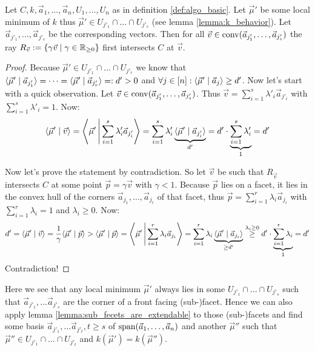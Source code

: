 \begin{lemma}
    \label{lemma:local_minimum_faces_is_visible_from_origin}
    Let $C, k, \vec a_1, \dots, \vec a_n, U_1, \dots, U_n$ as in definition \ref{def:algo_basic}. Let $\vec\mu'$ be some local minimum of $k$ thus $\vec\mu' \in U_{j'_1}\cap \dots \cap U_{j'_s}$ (see lemma \ref{lemma:k_behavior}). Let $\vec a_{j'_1}, \dots, \vec a_{j'_s}$ be the corresponding vectors. Then for all $\vec v \in \operatorname{conv}(\vec a_{j'_1}, \dots, \vec a_{j'_s})$ the ray $R_{\vec v} := \{\gamma\vec v \mid \gamma \in \mathbb{R}_{\geq 0}\}$ first intersects $C$ at $\vec v$.
\end{lemma}
\begin{proof}
    Because $\vec \mu' \in U_{j'_1}\cap \dots \cap U_{j'_r}$ we know that $\langle \vec\mu' \mid \vec a_{j'_1} \rangle = \dots = \langle \vec\mu' \mid \vec a_{j'_r} \rangle =: d' > 0$ and $\forall j\in [n]: \langle \vec\mu' \mid \vec a_j \rangle \geq d'$. Now let's start with a quick observation. Let $\vec v \in \operatorname{conv}(\vec a_{j'_1}, \dots, \vec a_{j'_s})$. Thus $\vec v = \sum_{i=1}^{s}\lambda'_i\vec a_{j'_i}$ with $\sum_{i=1}^{s}\lambda'_i = 1$. Now:
    $$\langle \vec\mu' \mid \vec v \rangle = \left\langle \vec\mu' \,\middle|\, \sum_{i=1}^{s}\lambda'_i\vec a_{j'_i} \right\rangle = \sum_{i=1}^{s}\lambda'_i \underbrace{\langle \vec\mu' \mid \vec a_{j'_i} \rangle}_{d'} = d'\cdot \underbrace{\sum_{i=1}^{s}\lambda'_i}_1 = d'$$

    Now let's prove the statement by contradiction. So let $\vec v$ be such that $R_{\vec v}$ intersects $C$ at some point $\vec p = \gamma \vec v$ with $\gamma < 1$. Because $\vec p$ lies on a facet, it lies in the convex hull of the corners $\vec a_{j_1}, \dots, \vec a_{j_r}$ of that facet, thus $\vec p = \sum_{i=1}^{r}\lambda_i\vec a_{j_i}$ with $\sum_{i=1}^{r}\lambda_i = 1$ and $\lambda_i \geq 0$. Now:
    $$d' = \langle \vec\mu' \mid \vec v \rangle = \frac{1}{\gamma} \langle \vec\mu' \mid \vec p \rangle > \langle \vec\mu' \mid \vec p \rangle = \left\langle \vec\mu' \,\middle|\, \sum_{i=1}^{r}\lambda_i\vec a_{j_i} \right\rangle = \sum_{i=1}^{r}\lambda_i\underbrace{\langle \vec\mu' \mid \vec a_{j_i} \rangle}_{\geq d'} \stackrel{\lambda_i\geq0}{\geq} d'\cdot \underbrace{\sum_{i=1}^{r}\lambda_i}_1 = d'$$
    Contradiction!
\end{proof}

\begin{observation}
    \label{obs:local_minima_in_front_facets}
    Here we see that any local minimum $\vec\mu'$ always lies in some $U_{j'_1} \cap \dots \cap U_{j'_s}$ such that $\vec a_{j'_1}, \dots \vec a_{j'_s}$ are the corner of a front facing (sub-)facet. Hence we can also apply lemma \ref{lemma:sub_fecets_are_extendable} to those (sub-)facets and find some basis $\vec a_{j'_1}, \dots \vec a_{j'_t}, t \geq s$ of $\operatorname{span}(\vec a_1, \dots, \vec a_n)$ and another $\vec\mu''$ such that $\vec\mu'' \in U_{j'_1} \cap \dots \cap U_{j'_t}$ and $k(\vec\mu') = k(\vec\mu'')$.
\end{observation}


